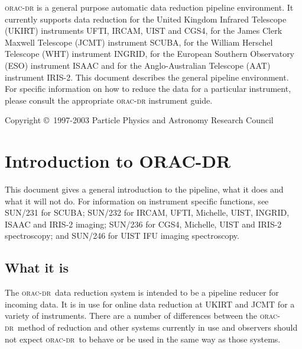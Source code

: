 \documentclass[twoside,11pt]{article}
\newcommand{\stardocinitials}  {SUN}
\newcommand{\stardocnumber}    {230.5}
\newcommand{\stardoccopyright} {Copyright \copyright\ 1997-2003 Particle Physics and Astronomy Research Council}
\newcommand{\stardocabstract} {\textsc{orac-dr} is a general purpose automatic
  data reduction pipeline environment. It currently supports data reduction
  for the United Kingdom Infrared Telescope (UKIRT) instruments UFTI, IRCAM,
  UIST  and CGS4, for the James Clerk Maxwell Telescope (JCMT) instrument
  SCUBA, for the William Herschel Telescope (WHT) instrument INGRID, for the
  European Southern Observatory (ESO) instrument ISAAC and
  for the Anglo-Australian Telescope (AAT) instrument IRIS-2. This document
  describes the general pipeline environment. For specific information on how
  to reduce the data for a particular instrument, please consult the
  appropriate \textsc{orac-dr} instrument guide.}
\newcommand{\stardocname}{\stardocinitials /\stardocnumber}
\newenvironment{latexonly}{}{}
\newcommand{\xref}[3]{#1}
\renewcommand{\_}{\texttt{\symbol{95}}}
\newcommand{\oracdr}{\textsc{orac-dr}}
\renewcommand{\thepage}{\roman{page}}
\begin{document}
\stardocabstract

\begin{latexonly}
\newpage
\vspace*{\fill}
\stardoccopyright
\end{latexonly}

  \newpage
  \begin{latexonly}
    \setlength{\parskip}{0mm}
    \tableofcontents
    \setlength{\parskip}{\medskipamount}
    \markboth{\stardocname}{\stardocname}
  \end{latexonly}
\cleardoublepage
\renewcommand{\thepage}{\arabic{page}}
\setcounter{page}{1}


\section{Introduction to ORAC-DR\label{Introduction_to_ORAC-DR}}

This document gives a general introduction to the pipeline, what it does and
what it will not do.  For information on instrument specific functions, see
\xref{SUN/231}{sun231}{} for SCUBA; \xref{SUN/232}{sun232}{} for IRCAM, UFTI,
Michelle, UIST, INGRID, ISAAC and IRIS-2 imaging; \xref{SUN/236}{sun236}{} for
CGS4, Michelle, UIST and IRIS-2 spectroscopy; and \xref{SUN/246}{sun246}{} for
UIST IFU imaging spectroscopy.

\subsection*{What it is\label{Introduction_to_ORAC-DR_What_it_is}}

The \oracdr\ data reduction system is intended to be a pipeline reducer
for incoming data. It is in use for online data reduction at UKIRT and
JCMT for a variety of instruments. There are a number of differences
between the \oracdr\ method of reduction and other systems currently in
use and observers should not expect \oracdr\ to behave or be used in
the same way as those systems.
\end{document}
